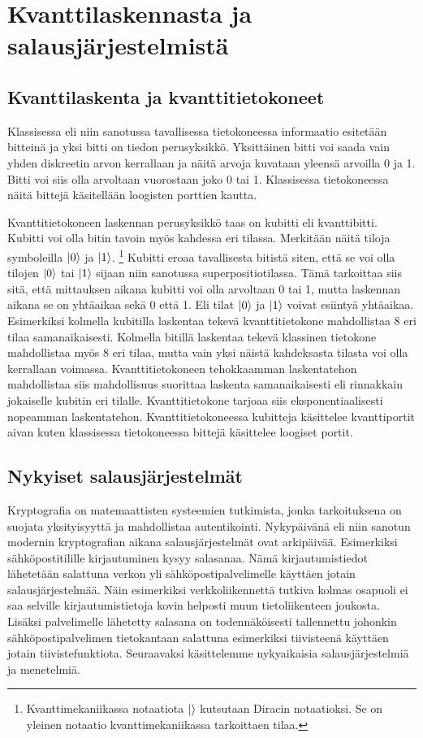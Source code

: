 \chapter{Kvanttilaskennasta ja salausjärjestelmistä\label{methods}}

\section{Kvanttilaskenta ja kvanttitietokoneet}
Klassisessa eli niin sanotussa tavallisessa tietokoneessa informaatio esitetään bitteinä ja yksi bitti on tiedon perusyksikkö. Yksittäinen bitti voi saada vain yhden diskreetin arvon kerrallaan ja näitä arvoja kuvataan yleensä arvoilla 0 ja 1. Bitti voi siis olla arvoltaan vuorostaan joko 0 tai 1. Klassisessa tietokoneessa näitä bittejä käsitellään loogisten porttien kautta.

Kvanttitietokoneen laskennan perusyksikkö taas on kubitti eli kvanttibitti. Kubitti voi olla bitin tavoin myös kahdessa eri tilassa. Merkitään näitä tiloja symboleilla
$\ket{0}$ ja $\ket{1}$. \footnote{Kvanttimekaniikassa notaatiota $\ket{}$ kutsutaan Diracin notaatioksi. Se on yleinen notaatio kvanttimekaniikassa tarkoittaen tilaa.} Kubitti eroaa tavallisesta bitistä siten, että se voi olla tilojen $\ket{0}$ tai $\ket{1}$ sijaan niin sanotussa superpositiotilassa. Tämä tarkoittaa siis sitä, että mittauksen aikana kubitti voi olla arvoltaan 0 tai 1, mutta laskennan aikana se on yhtäaikaa sekä 0 että 1. Eli tilat $\ket{0}$ ja $\ket{1}$ voivat esiintyä yhtäaikaa. Esimerkiksi kolmella kubitilla laskentaa tekevä kvanttitietokone mahdollistaa 8 eri tilaa samanaikaisesti. Kolmella bitillä laskentaa tekevä klassinen tietokone mahdollistaa myös 8 eri tilaa, mutta vain yksi näistä kahdeksasta tilasta voi olla kerrallaan voimassa. Kvanttitietokoneen tehokkaamman laskentatehon mahdollistaa siis mahdollisuus suorittaa laskenta samanaikaisesti eli rinnakkain jokaiselle kubitin eri tilalle. Kvanttitietokone tarjoaa siis eksponentiaalisesti nopeamman laskentatehon. Kvanttitietokoneessa kubitteja käsittelee kvanttiportit aivan kuten klassisessa tietokoneessa bittejä käsittelee loogiset portit.

\section{Nykyiset salausjärjestelmät}
Kryptografia on matemaattisten systeemien tutkimista, jonka tarkoituksena on suojata yksityisyyttä ja mahdollistaa autentikointi. Nykypäivänä eli niin sanotun modernin kryptografian aikana salausjärjestelmät ovat arkipäivää. Esimerkiksi sähköpostitilille kirjautuminen kysyy salasanaa. Nämä kirjautumistiedot lähetetään salattuna verkon yli sähköpostipalvelimelle käyttäen jotain salausjärjestelmää. Näin esimerkiksi verkkoliikennettä tutkiva kolmas osapuoli ei saa selville kirjautumistietoja kovin helposti muun tietoliikenteen joukosta. Lisäksi palvelimelle lähetetty salasana on todennäköisesti tallennettu johonkin sähköpostipalvelimen tietokantaan salattuna esimerkiksi tiivisteenä käyttäen jotain tiivistefunktiota. Seuraavaksi käsittelemme nykyaikaisia salausjärjestelmiä ja menetelmiä.


